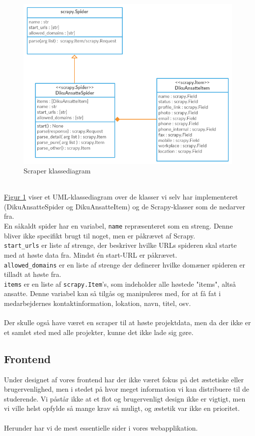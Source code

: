 \documentclass[12pt]{article}
\begin{document}
\begin{figure}[H]
    \centering
    \includegraphics[scale=0.5]{scraper_class_diagram.png}
    \caption{Scraper klassediagram}
    \label{fig:scraper_class_diagram}
\end{figure}~\\
\hyperref[fig:scraper_class_diagram]{Figur \ref*{fig:scraper_class_diagram}} viser et UML-klassediagram over de klasser vi selv har implementeret (DikuAnsatteSpider og DikuAnsatteItem) og de Scrapy-klasser som de nedarver fra.\\
En såkaldt spider har en variabel, \texttt{name} repræsenteret som en streng. Denne bliver ikke specifikt brugt til noget, men er påkrævet af Scrapy.\\
\texttt{start\_urls} er liste af strenge, der beskriver hvilke URLs spideren skal starte med at høste data fra. Mindst én start-URL er påkrævet.\\
\texttt{allowed\_domains} er en liste af strenge der definerer hvilke domæner spideren er tilladt at høste fra.\\
\texttt{items} er en liste af \texttt{scrapy.Item}'s, som indeholder alle høstede "items", altså ansatte. Denne variabel kan så tilgås og manipuleres med, for at få fat i medarbejdernes kontaktinformation, lokation, navn, titel, osv.\\
\\
Der skulle også have været en scraper til at høste projektdata, men da der ikke er et samlet sted med alle projekter, kunne det ikke lade sig gøre.
\subsection{Frontend}
Under designet af vores frontend har der ikke været fokus på det æstetiske eller brugervenlighed, men i stedet på hvor meget information vi kan distribuere til de studerende. Vi påstår ikke at et flot og brugervenligt design ikke er vigtigt, men vi ville helst opfylde så mange krav så muligt, og æstetik var ikke en prioritet.\\
\\
Herunder har vi de mest essentielle sider i vores webapplikation.
\end{document}

